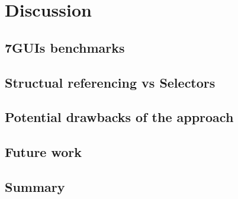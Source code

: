 \chapter{Discussion}
\label{chap:discussion}


\section{7GUIs benchmarks}
\section{Structual referencing vs Selectors}
\section{Potential drawbacks of the approach}
\section{Future work}
\section{Summary}
